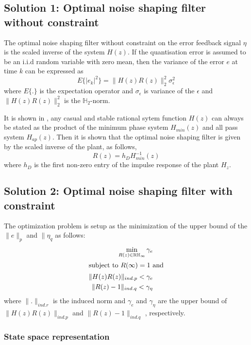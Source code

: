 \documentclass[a4paper]{article}
\begin{document}
\subsection{Solution 1: Optimal noise shaping filter without constraint}
The optimal noise shaping filter without constraint on the error feedback signal $\eta$ is the scaled inverse of the system $H(z)$.   If the quantisation error is assumed to be an i.i.d random variable with zero mean, then the variance of the error $e$ at time $k$  can be expressed as 
\begin{equation}
	E\{|e_{k}|^2\} = \|H(z) R(z) \|_{2}^{2} \sigma_{\epsilon}^{2}
\end{equation}
where $E\{.\}$ is the expectation operator and $\sigma_{\epsilon}$ is variance of the $\epsilon$ and $\|H(z) R(z) \|_{2}^{2}$  is the $\mathbb{H}_{2}$-norm.

It is shown in \cite{oppenheim99}, any casual and stable rational sytem function $H(z)$ can always be stated as the product of the minimum phase system $H_{min}(z)$ and all pass system $H_{ap}(z)$. Then it is shown that the optimal noise shaping filter is given by the scaled inverse of the plant, as follows, 
\begin{equation}
	R(z) = h_{D} H_{min}^{-1}(z)
\end{equation}
where $h_{D}$ is the first non-zero entry of the impulse response of the plant $H_{z}$.

\subsection{Solution 2: Optimal noise shaping filter with constraint}
The optimization problem is setup as the minimization of the upper bound of the $\|e\|_{p}$ and $\|\eta_{q}$ as follows:
\begin{align}
	\min_{R(z) \in \mathbb{RH}_{\infty}}\gamma_{e} \\
	\intertext{subject to $R(\infty) = 1$ and}
	\|H(z)R(z)\|_{ind.p} < \gamma_{e} \\
	\|R(z) - 1\|_{ind.q}< \gamma_{\eta}
\end{align}
where $\|.\|_{ind.r}$ is the induced norm and $\gamma_{e}$ and $\gamma_{\eta}$ are the upper bound of $\|H(z)R(z)\|_{ind.p}$ and $\|R(z) - 1\|_{ind.q}$ , respectively.

\subsubsection*{State space representation}
\end{document}
